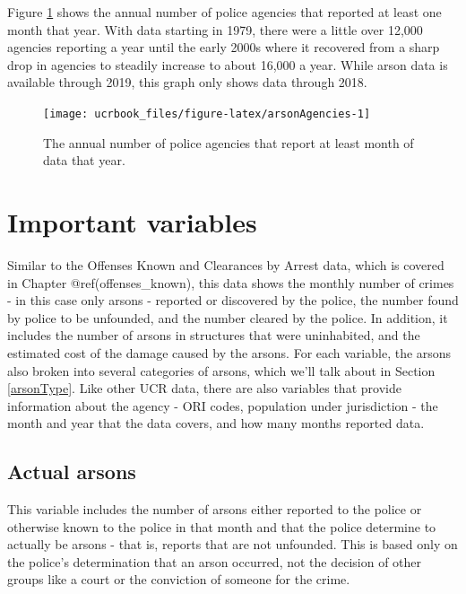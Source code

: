 \documentclass[
  12pt,
  openany]{book}
\begin{document}
Figure \ref{fig:arsonAgencies} shows the annual number of police agencies that reported at least one month that year. With data starting in 1979, there were a little over 12,000 agencies reporting a year until the early 2000s where it recovered from a sharp drop in agencies to steadily increase to about 16,000 a year. While arson data is available through 2019, this graph only shows data through 2018.

\begin{figure}

{\centering \texttt{[image: ucrbook\_files/figure-latex/arsonAgencies-1]} 

}

\caption{The annual number of police agencies that report at least month of data that year.}\label{fig:arsonAgencies}
\end{figure}

\hypertarget{important-variables-5}{%
\section{Important variables}\label{important-variables-5}}

Similar to the Offenses Known and Clearances by Arrest data, which is covered in Chapter @ref(offenses\_known), this data shows the monthly number of crimes - in this case only arsons - reported or discovered by the police, the number found by police to be unfounded, and the number cleared by the police. In addition, it includes the number of arsons in structures that were uninhabited, and the estimated cost of the damage caused by the arsons. For each variable, the arsons also broken into several categories of arsons, which we'll talk about in Section \ref{arsonType}. Like other UCR data, there are also variables that provide information about the agency - ORI codes, population under jurisdiction - the month and year that the data covers, and how many months reported data.

\hypertarget{actual-arsons}{%
\subsection{Actual arsons}\label{actual-arsons}}

This variable includes the number of arsons either reported to the police or otherwise known to the police in that month and that the police determine to actually be arsons - that is, reports that are not unfounded. This is based only on the police's determination that an arson occurred, not the decision of other groups like a court or the conviction of someone for the crime.
\end{document}
